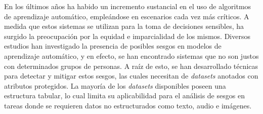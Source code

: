 \begin{resumen}
	

	En los \'ultimos a\~nos ha habido un incremento sustancial en el uso de algoritmos de aprendizaje autom\'atico, emple\'andose en
	escenarios cada vez m\'as cr\'iticos. A medida que estos sistemas se utilizan para la toma de decisiones sensibles, ha surgido 
	la preocupaci\'on por la equidad e imparcialidad de los mismos. Diversos estudios han investigado la presencia de posibles sesgos
    en modelos de aprendizaje autom\'atico, y en efecto, se han encontrado sistemas que no son justos con determinados grupos de personas.
	A ra\'iz de esto, se han desarrollado t\'ecnicas para detectar y mitigar estos sesgos, las cuales necesitan de \emph{datasets} anotados
	con atributos protegidos. La mayor\'ia de los \emph{datasets} disponibles poseen una estructura tabular, lo cual limita su aplicabilidad
	para el an\'alisis de sesgos en tareas donde se requieren datos no estructurados como texto, audio e im\'agenes.
	

\end{resumen}
